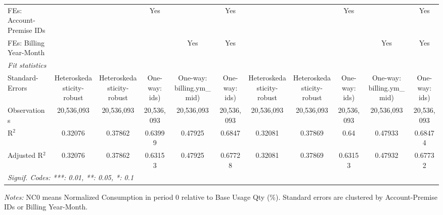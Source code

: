 \begin{table}[htbp]
\begin{tabular}{lcccccccccc}
FEs: Account-Premise IDs &  &  & Yes &  & Yes &  &  & Yes &  & Yes\\
FEs: Billing Year-Month &  &  &  & Yes & Yes &  &  &  & Yes & Yes\\
\midrule
\emph{Fit statistics}&  & & & & & & & & & \\
Standard-Errors& Heteroskedasticity-robust&Heteroskedasticity-robust&One-way: ids)&One-way: billing.ym\_mid)&One-way: ids)&Heteroskedasticity-robust&Heteroskedasticity-robust&One-way: ids)&One-way: billing.ym\_mid)&One-way: ids)\\
Observations & 20,536,093&20,536,093&20,536,093&20,536,093&20,536,093&20,536,093&20,536,093&20,536,093&20,536,093&20,536,093\\
R$^2$ & 0.32076&0.37862&0.63999&0.47925&0.6847&0.32081&0.37869&0.64&0.47933&0.68474\\
Adjusted R$^2$ & 0.32076&0.37862&0.63153&0.47925&0.67728&0.32081&0.37869&0.63153&0.47932&0.67732\\
\bottomrule\bottomrule
\multicolumn{11}{l}{\emph{Signif. Codes: ***: 0.01, **: 0.05, *: 0.1}}\\
\end{tabular}

\emph{\medskip Notes:} NC0 means Normalized Consumption in period 0 relative to Base Usage Qty (\%). Standard errors are clustered by Account-Premise IDs or Billing Year-Month.
\end{table}
